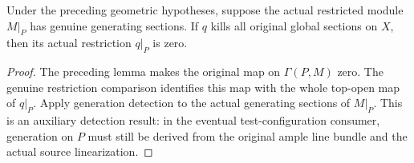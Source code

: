 \begin{proposition}
\label{prop:scheme-module-principal-restriction-zero}
\leanok
{}
Under the preceding geometric hypotheses, suppose the actual
restricted module $M|_P$ has genuine generating sections.
If $q$ kills all original global sections on $X$, then its
actual restriction $q|_P$ is zero.
\end{proposition}
\begin{proof}
The preceding lemma makes the original map on $\Gamma(P,M)$
zero. The genuine restriction comparison identifies this map
with the whole top-open map of $q|_P$. Apply generation detection
to the actual generating sections of $M|_P$.
This is an auxiliary detection result: in the eventual test-configuration
consumer, generation on $P$ must still be derived from the original
ample line bundle and the actual source linearization.
\end{proof}
